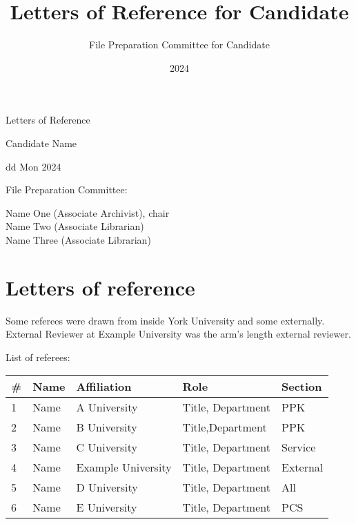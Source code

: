 \documentclass[12pt,oneside]{book}
\title{Letters of Reference for Candidate}
\author{File Preparation Committee for Candidate}
\date{2024}
\begin{document}
\begin{titlepage}

  \null\vfill

  \begin{center}

    {\Huge Letters of Reference }
    \vspace{2cm}

    {\Large Candidate Name }
    \vspace{1cm}

    {\large dd Mon 2024 }

\end{center}

\vfill
\vfill

{\large
  File Preparation Committee:

  Name One (Associate Archivist), chair \\
  \indent Name Two (Associate Librarian) \\
  \indent Name Three (Associate Librarian)

}

\hfill

\end{titlepage}

\tableofcontents
\markboth{}{}

\chapter{Letters of reference}

Some referees were drawn from inside York University and some externally.  External Reviewer at Example University was the arm's length external reviewer.

\vspace{3cm}

List of referees:

\vspace{1cm}

\begin{tabular}{ll >{\raggedright}p{4cm} >{\raggedright}p{6cm} l}

  \# & Name & Affiliation & Role & Section \\
  \toprule
  1 & Name & A University & Title, Department & PPK \\
  2 & Name & B University & Title,Department & PPK \\
  3 & Name & C University & Title, Department & Service \\
  4 & Name & Example University & Title, Department & External \\
  5 & Name & D University & Title, Department & All \\
  6 & Name & E University & Title, Department & PCS

  \end{tabular}
\end{document}
